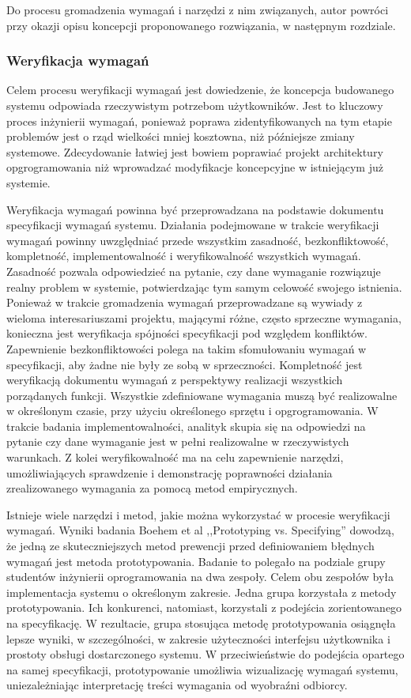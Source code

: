         Do procesu gromadzenia wymagań i narzędzi z nim związanych, autor powróci przy okazji opisu koncepcji proponowanego rozwiązania, w następnym rozdziale.

      \subsubsection{Weryfikacja wymagań}

        Celem procesu weryfikacji wymagań jest dowiedzenie, że koncepcja budowanego systemu odpowiada rzeczywistym potrzebom użytkowników. Jest to kluczowy proces inżynierii wymagań, ponieważ poprawa zidentyfikowanych na tym etapie problemów jest o rząd wielkości mniej kosztowna, niż późniejsze zmiany systemowe. Zdecydowanie łatwiej jest bowiem poprawiać projekt architektury opgrogramowania niż wprowadzać modyfikacje koncepcyjne w istniejącym już systemie. 

        Weryfikacja wymagań powinna być przeprowadzana na podstawie dokumentu specyfikacji wymagań systemu. Działania podejmowane w trakcie weryfikacji wymagań powinny uwzględniać przede wszystkim zasadność, bezkonfliktowość, kompletność, implementowalność i weryfikowalność wszystkich wymagań. Zasadność pozwala odpowiedzieć na pytanie, czy dane wymaganie rozwiązuje realny problem w systemie, potwierdzając tym samym celowość swojego istnienia. Ponieważ w trakcie gromadzenia wymagań przeprowadzane są wywiady z wieloma interesariuszami projektu, mającymi różne, często sprzeczne wymagania, konieczna jest weryfikacja spójności specyfikacji pod względem konfliktów. Zapewnienie bezkonfliktowości polega na takim sfomułowaniu wymagań w specyfikacji, aby żadne nie były ze sobą w sprzeczności. Kompletność jest weryfikacją dokumentu wymagań z perspektywy realizacji wszystkich porządanych funkcji. Wszystkie zdefiniowane wymagania muszą być realizowalne w określonym czasie, przy użyciu określonego sprzętu i opgrogramowania. W trakcie badania implementowalności, analityk skupia się na odpowiedzi na pytanie czy dane wymaganie jest w pełni realizowalne w rzeczywistych warunkach. Z kolei weryfikowalność ma na celu zapewnienie narzędzi, umożliwiających sprawdzenie i demonstrację poprawności działania zrealizowanego wymagania za pomocą metod empirycznych.

        Istnieje wiele narzędzi i metod, jakie można wykorzystać w procesie weryfikacji wymagań. Wyniki badania Boehem et al ,,Prototyping vs. Specifying'' \cite{Boehm84} dowodzą, że jedną ze skuteczniejszych metod prewencji przed definiowaniem błędnych wymagań jest metoda prototypowania. Badanie to polegało na podziale grupy studentów inżynierii oprogramowania na dwa zespoły. Celem obu zespołów była implementacja systemu o określonym zakresie. Jedna grupa korzystała z metody prototypowania. Ich konkurenci, natomiast, korzystali z podejścia zorientowanego na specyfikację. W rezultacie, grupa stosująca metodę prototypowania osiągnęła lepsze wyniki, w szczególności, w zakresie użyteczności interfejsu użytkownika i prostoty obsługi dostarczonego systemu. W przeciwieństwie do podejścia opartego na samej specyfikacji, prototypowanie umożliwia wizualizację wymagań systemu, uniezależniając interpretację treści wymagania od wyobraźni odbiorcy. 

